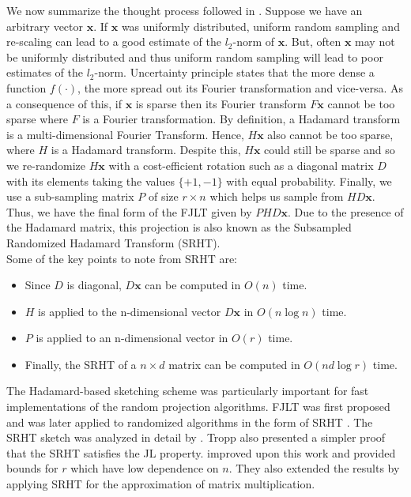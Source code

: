 We now summarize the thought process followed in \cite{ailon_fast_2009}. Suppose we have an arbitrary vector $\textbf{x}$.  If $\textbf{x}$ was uniformly distributed, uniform random sampling and re-scaling can lead to a good estimate of the $l_2$-norm of $\textbf{x}$. But, often $\textbf{x}$ may not be uniformly distributed and thus uniform random sampling will lead to poor estimates of the $l_2$-norm. Uncertainty principle states that the more dense a function $f(\cdot)$, the more spread out its Fourier transformation and vice-versa. As a consequence of this, if $\textbf{x}$ is sparse then its Fourier transform $F\textbf{x}$ cannot be too sparse where $F$ is a Fourier transformation. By definition, a Hadamard transform is a multi-dimensional Fourier Transform. Hence, $H\textbf{x}$ also cannot be too sparse, where $H$ is a Hadamard transform. Despite this, $H\textbf{x}$ could still be sparse and so we re-randomize $H\textbf{x}$ with a cost-efficient rotation such as a diagonal matrix $D$ with its elements taking the values $\{+1, -1\}$ with equal probability. Finally, we use a sub-sampling matrix $P$ of size $r \times n$ which helps us sample from $HD\textbf{x}$. Thus, we have the final form of the FJLT given by $PHD\textbf{x}$. Due to the presence of the Hadamard matrix, this projection is also known as the Subsampled Randomized Hadamard Transform (SRHT). \\

Some of the key points to note from SRHT are:
\begin{itemize}
\item Since $D$ is diagonal, $D\textbf{x}$ can be computed in $O(n)$ time.
\item $H$ is applied to the n-dimensional vector $D\textbf{x}$ in $O(n\log n)$ time. 
\item $P$ is applied to an n-dimensional vector in $O(r)$ time.
\item Finally, the SRHT of a $n\times d$ matrix can be computed in $O(nd\log r)$ time. 
\end{itemize}

The Hadamard-based sketching scheme was particularly important for fast implementations of the random projection algorithms. FJLT was first proposed \cite{ailon_fast_2009} and was later applied to randomized algorithms in the form of SRHT \cite{sarlos_improved_2006, drineas_faster_2011}. The SRHT sketch was analyzed in detail by \cite{tropp_improved_2011}. Tropp also presented a simpler proof that the SRHT satisfies the JL property. \cite{boutsidis_improved_2013} improved upon this work and provided bounds for $r$ which have low dependence on  $n$. They also extended the results by applying SRHT for the approximation of matrix multiplication. \\

